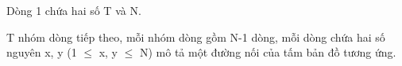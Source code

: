 Dòng 1 chứa hai số T và N.  

   T nhóm dòng tiếp theo, mỗi nhóm dòng gồm N-1 dòng, mỗi dòng chứa hai số nguyên x, y (1  $\le$  x, y  $\le$  N) mô tả một đường nối của tấm bản đồ tương ứng.